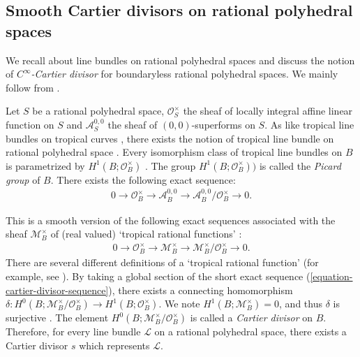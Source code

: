 \documentclass[a4paper,dvipdfmx,reqno,12pt]{amsart}
\theoremstyle{definition}
\newcommand{\mcal}[1]{\mathcal{#1}}%
\numberwithin{equation}{section}
\begin{document}
\subsection{Smooth Cartier divisors on rational 
polyhedral spaces}



We recall about line bundles on 
rational polyhedral spaces and discuss the notion of
\emph{$C^{\infty}$-Cartier divisor}
for boundaryless rational polyhedral spaces.
We mainly follow 
from \cite{MR3903579,gross2019sheaftheoretic}.


Let $S$ be a rational polyhedral space, 
$\mathcal{O}^{\times}_S$ the sheaf of 
locally integral affine linear function on $S$
and $\mathcal{A}^{0,0}_S$ the sheaf of 
$(0,0)$-superforms on $S$. 
As like tropical line bundles on tropical curves
\cite[Definition 4.4]{mikhalkinTropicalCurvesTheir2008a},
there exists the notion of tropical line bundle on 
rational polyhedral space
\cite[Definition 3.12]{gross2019sheaftheoretic}.
Every isomorphism class of 
tropical line bundles on $B$ is parametrized by 
$H^{1}(B;\mathcal{O}^{\times}_B)$
\cite[Proposition 3.13]{gross2019sheaftheoretic}.
The group $H^{1}(B;\mcal{O}^{\times}_B))$ is called 
the \emph{Picard group} of $B$.
There exists the following exact sequence:
\begin{align}
\label{equation-smoooth-cartier-divisor-sequence}
0\to \mathcal{O}^{\times}_B \to
\mathcal{A}^{0,0}_{B} \to
\mathcal{A}^{0,0}_{B}/\mathcal{O}^{\times}_B\to 0.
\end{align}

This is a smooth version of the following exact
sequences associated with the sheaf 
$\mcal{M}_B^{\times}$
of (real valued) `tropical rational functions'
\cite[Definition 4.1]{MR3894860}:
\begin{align}
\label{equation-cartier-divisor-sequence}
0 \to \mcal{O}^{\times}_B \to \mcal{M}_B^{\times} 
\to \mcal{M}_B^{\times}/\mathcal{O}^{\times}_B\to 0.
\end{align}
There are several different definitions of a 
`tropical rational function' 
(for example, see \cite{mikhalkin2018tropical}).
By taking a global section of the
short exact sequence 
(\ref{equation-cartier-divisor-sequence}),
there exists a connecting homomorphism 
$\delta \colon 
H^{0}(B;\mcal{M}_B^{\times}/\mathcal{O}^{\times}_B)
\to H^{1}(B;\mathcal{O}^{\times}_B)$.
We note $H^{1}(B;\mcal{M}_{B}^{\times})=0$, 
and thus $\delta$ is surjective
\cite[Lemma 4.5, Proposition 4.6]{MR3894860}.
The element $H^{0}(B;\mcal{M}_B^{\times}/\mathcal{O}^{\times}_B)$
is called a \emph{Cartier divisor} on $B$.
Therefore, for every line bundle $\mathcal{L}$ on a rational polyhedral 
space, there exists a Cartier divisor $s$ 
which represents $\mathcal{L}$.
\end{document}

